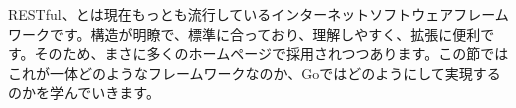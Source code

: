 RESTful、とは現在もっとも流行しているインターネットソフトウェアフレームワークです。構造が明瞭で、標準に合っており、理解しやすく、拡張に便利です。そのため、まさに多くのホームページで採用されつつあります。この節ではこれが一体どのようなフレームワークなのか、Goではどのようにして実現するのかを学んでいきます。
